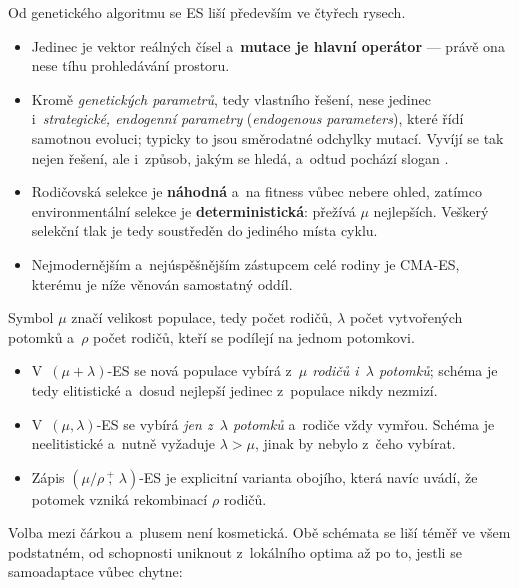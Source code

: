 \documentclass[11pt,a4paper]{article}
\theoremstyle{definition}
\begin{document}
Od genetického algoritmu se ES liší především ve čtyřech rysech.

\begin{itemize}
\item Jedinec je vektor reálných čísel a~\textbf{mutace je hlavní operátor} --- právě ona
  nese tíhu prohledávání prostoru.
\item Kromě \emph{genetických parametrů}, tedy vlastního řešení, nese jedinec
  i~\emph{strategické, endogenní parametry} (\emph{endogenous parameters}), které řídí
  samotnou evoluci; typicky to jsou směrodatné odchylky mutací. Vyvíjí se tak nejen řešení,
  ale i~způsob, jakým se hledá, a~odtud pochází slogan .
\item Rodičovská selekce je \textbf{náhodná} a~na fitness vůbec nebere ohled, zatímco
  environmentální selekce je \textbf{deterministická}: přežívá $\mu$ nejlepších. Veškerý
  selekční tlak je tedy soustředěn do jediného místa cyklu.
\item Nejmodernějším a~nejúspěšnějším zástupcem celé rodiny je CMA-ES, kterému je níže
  věnován samostatný oddíl.
\end{itemize}

\begin{defbox}[Notace ES]
Symbol $\mu$ značí velikost populace, tedy počet rodičů, $\lambda$ počet vytvořených potomků
a~$\rho$ počet rodičů, kteří se podílejí na jednom potomkovi.
\begin{itemize}
\item V~$(\mu + \lambda)$-ES se nová populace vybírá z~\emph{$\mu$ rodičů i~$\lambda$
  potomků}; schéma je tedy elitistické a~dosud nejlepší jedinec z~populace nikdy nezmizí.
\item V~$(\mu, \lambda)$-ES se vybírá \emph{jen z~$\lambda$ potomků} a~rodiče vždy vymřou.
  Schéma je neelitistické a~nutně vyžaduje $\lambda > \mu$, jinak by nebylo z~čeho vybírat.
\item Zápis $(\mu/\rho \,\overset{+}{,}\, \lambda)$-ES je explicitní varianta obojího, která
  navíc uvádí, že potomek vzniká rekombinací $\rho$ rodičů.
\end{itemize}
\end{defbox}

Volba mezi čárkou a~plusem není kosmetická. Obě schémata se liší téměř ve všem podstatném,
od schopnosti uniknout z~lokálního optima až po to, jestli se samoadaptace vůbec chytne:
\end{document}
